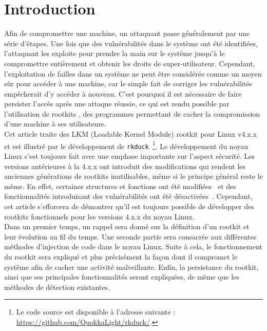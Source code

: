 \documentclass[12pt]{article}
\begin{document}
\newcommand*{\escape}[1]{\texttt{\textbackslash#1}}
\newcommand*{\escapeI}[1]{\texttt{\expandafter\string\csname #1\endcsname}}
\newcommand*{\escapeII}[1]{\texttt{\char`\\#1}}


\section*{Introduction}

    Afin de compromettre une machine, un attaquant passe généralement par une série d'étapes. Une fois que des vulnérabilités dans le système ont été identifiées, l'attaquant les exploite pour prendre la main sur le système jusqu'à le compromettre entièrement et obtenir les droits de super-utilisateur. Cependant, l'exploitation de failles dans un système ne peut être considérée comme un moyen sûr pour accéder à une machine, car le simple fait de corriger les vulnérabilités empêcherait d'y accéder à nouveau. C'est pourquoi il est nécessaire de faire persister l'accès après une attaque réussie, ce qui est rendu possible par l'utilisation de rootkits \cite{turbochaos}\cite{zenk}, des programmes permettant de cacher la compromission d'une machine à ses utilisateurs. \\
    
    Cet article traite des LKM (Loadable Kernel Module) rootkit pour Linux v4.x.x et est illustré par le développement de \texttt{rkduck}~\footnote{Le code source est disponible à l'adresse suivante : \href{https://github.com/QuokkaLight/rkduck/}{https://github.com/QuokkaLight/rkduck/}.}. Le développement du noyau Linux s'est toujours fait avec une emphase importante sur l'aspect sécurité. Les versions antérieures à la 4.x.x ont introduit des modifications qui rendent les anciennes générations de rootkits inutilisables, même si le principe général reste le même. En effet, certaines structures et fonctions ont été modifiées~\cite{turbochaos2} et des fonctionnalités introduisant des vulnérabilités ont été désactivées~\cite{devmem-restrict}. Cependant, cet article s'efforcera de démontrer qu'il est toujours possible de développer des rootkits fonctionnels pour les versions 4.x.x du noyau Linux. \\

    Dans un premier temps, un rappel sera donné sur la définition d'un rootkit et leur évolution au fil du temps. Une seconde partie sera consacrée aux différentes méthodes d'injection de code dans le noyau Linux. Suite à cela, le fonctionnement du rootkit sera expliqué et plus précisément la façon dont il compromet le système afin de cacher une activité malveillante. Enfin, la persistance du rootkit, ainsi que ses principales fonctionnalités seront expliquées, de même que les méthodes de détection existantes.
\end{document}
